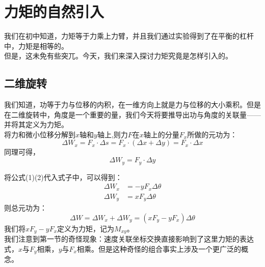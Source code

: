 \chapter{力矩的自然引入}
我们在初中知道，力矩等于力乘上力臂，并且我们通过实验得到了在平衡的杠杆中，力矩是相等的。\\
但是，这未免有些突兀。今天，我们来深入探讨力矩究竟是怎样引入的。\\
\section{二维旋转}
我们知道，功等于力与位移的内积，在一维方向上就是力与位移的大小乘积。但是在二维旋转中，角度是一个重要的量，我们今天将要推导出功与角度的关联量——并将其定义为力矩。\\
将力和微小位移分解到$x$轴和$y$轴上,则力$F$在$x$轴上的分量$F_x$所做的元功为：
\begin{equation}
  \Delta W_x=F_x \cdot \Delta s=F_x \cdot (\Delta x+\Delta y)=F_x \cdot \Delta x
\end{equation}
同理可得，
\begin{equation}
  \Delta W_y = F_y \cdot \Delta y
\end{equation}

将公式(1)(2)代入式子中，可以得到：
\begin{align}
  \Delta W_x&=-yF_x \Delta \theta \\
  \Delta W_y&=xF_y \Delta \theta
\end{align}
则总元功为：
\begin{equation}
  \Delta W=\Delta W_x+\Delta W_y=(xF_y-yF_x)\Delta \theta
\end{equation}
我们将$xF_y-yF_x$定义为力矩，记为$M_{xy}$。\\
我们注意到第一节的奇怪现象：速度关联坐标交换直接影响到了这里力矩的表达式，$x$与$F_y$相乘，$y$与$F_x$相乘。但是这种奇怪的组合事实上涉及一个更广泛的概念。
